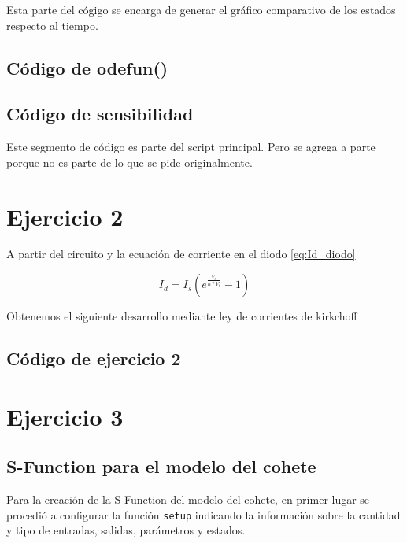 \documentclass[12pt,letterpaper]{article}
\begin{document}
Esta parte del cógigo se encarga de generar el gráfico comparativo de los estados respecto al tiempo. 


\subsection{Código de odefun()}


\subsection{Código de sensibilidad}
Este segmento de código es parte del script principal. Pero se agrega a parte porque no es parte de lo que se pide originalmente.


\section{Ejercicio 2}
A partir del circuito y la ecuación de corriente en el diodo \ref{eq:Id_diodo}

\begin{equation}
\label{eq:Id_diodo}
I_d=I_s(e^{\frac{V_d}{n*V_t}}-1)
\end{equation}

Obtenemos el siguiente desarrollo mediante ley de corrientes de kirkchoff




\subsection{Código de ejercicio 2}

\section{Ejercicio 3}

\subsection{S-Function para el modelo del cohete}
Para la creación de la S-Function del modelo del cohete, en primer lugar se procedió a configurar la
función \texttt{setup} indicando la información sobre la cantidad y tipo de entradas, salidas,
parámetros y estados.
\end{document}

